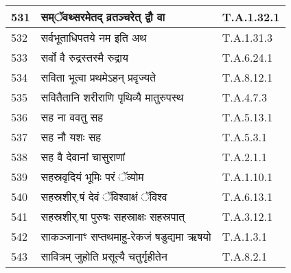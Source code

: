 \documentclass[17pt]{extarticle}
\begin{document}
\begin{longtable}{||p{0.4in}||p{4.9in}||p{0.9in}||}
    \hline
        
    531 & सम्ॅवथ्सरमेतद् व्रतञ्चरेत् द्वौ वा & T.A.1.32.1       \\
    
    \hline
        
    532 & सर्वभूताधिपतये नम इति अथ & T.A.1.31.3       \\
    
    \hline
        
    533 & सर्वो वै रुद्रस्तस्मै रुद्राय & T.A.6.24.1       \\
    
    \hline
        
    534 & सविता भूत्वा प्रथमेऽहन् प्रवृज्यते & T.A.8.12.1       \\
    
    \hline
        
    535 & सवितैतानि शरीराणि पृथिव्यै मातुरुपस्थ & T.A.4.7.3       \\
    
    \hline
        
    536 & सह ना ववतु सह & T.A.5.13.1       \\
    
    \hline
        
    537 & सह नौ यशः सह & T.A.5.3.1       \\
    
    \hline
        
    538 & सह वै देवानां चासुराणां & T.A.2.1.1       \\
    
    \hline
        
    539 & सहस्रवृदियं भूमिः परं ॅव्योम & T.A.1.10.1       \\
    
    \hline
        
    540 & सहस्रशीर्.षं देवं ॅविश्वाक्षं ॅविश्व & T.A.6.13.1       \\
    
    \hline
        
    541 & सहस्रशीर्.षा पुरुषः सहस्राक्षः सहस्रपात् & T.A.3.12.1       \\
    
    \hline
        
    542 & साकञ्जानाꣳ सप्तथमाहु{-}रेकजं षडुद्यमा ऋषयो & T.A.1.3.1       \\
    
    \hline
        
    543 & सावित्रम् जुहोति प्रसूत्यै चतुर्गृहीतेन & T.A.8.2.1       \\
    

\end{longtable}
\end{document}
